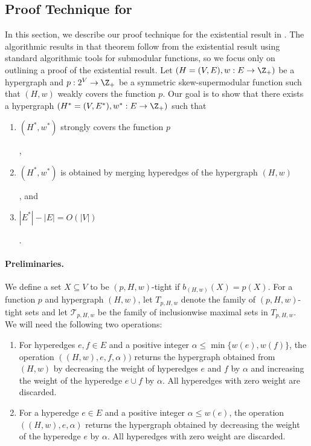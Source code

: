 \subsection{Proof Technique for }
In this section, we describe our proof technique for the existential result in . 
The algorithmic results in that theorem follow from the existential result using standard algorithmic tools for submodular functions, so we focus only on outlining a proof of the existential result. 
Let $(H=(V, E), w: E\rightarrow \Z_+)$ be a hypergraph and $p: 2^V\rightarrow \Z_+$ be a symmetric skew-supermodular function such that $(H, w)$ weakly covers the function $p$. Our goal is to show that there exists a hypergraph $(H^*=(V, E^*), w^*: E\rightarrow \Z_+)$ such that 
\begin{enumerate}[label=(\arabic*)]
    \item \hypertarget{WeakToStrong(1)}{$(H^*, w^*)$ strongly covers the function $p$},
    \item \hypertarget{WeakToStrong(2)}{$(H^*, w^*)$ is obtained by merging hyperedges of the hypergraph $(H, w)$}, and
    \item \hypertarget{WeakToStrong(3)}{$|E^*|-|E|=O(|V|)$}. 
\end{enumerate}

\paragraph{Preliminaries.} We define a set $X\subseteq V$ to be $(p, H, w)$-tight if $b_{(H, w)}(X) = p(X)$. For a function $p$ and hypergraph $(H, w)$, let $T_{p, H, w}$ denote the family of $(p,H, w)$-tight sets and let $\mathcal{T}_{p, H, w}$ be the family of inclusionwise maximal sets in $T_{p, H, w}$. We will need the following two operations: 
\begin{enumerate}[label=(\roman*)]
    \item For hyperedges $e, f\in E$ and a positive integer  $\alpha \le \min\{w(e), w(f)\}$, the operation \merge$((H, w), e, f, \alpha))$ returns the hypergraph obtained from $(H, w)$ by decreasing the weight of hyperedges $e$ and $f$ by $\alpha$ and increasing the weight of the hyperedge $e\cup f$ by $\alpha$. All hyperedges with zero weight are discarded.
    \item For a hyperedge $e\in E$ and a positive integer $\alpha\le w(e)$, the operation \reduce$((H, w), e, \alpha)$ returns the hypergraph obtained by decreasing the weight of the hyperedge $e$ by $\alpha$. All hyperedges with zero weight are discarded.
\end{enumerate}
 
